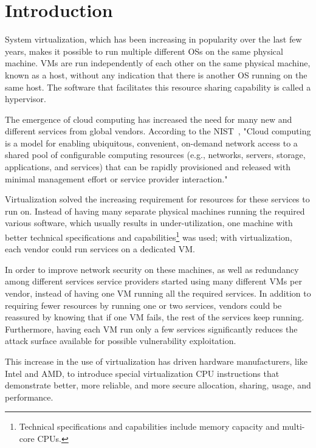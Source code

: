 \chapter{Introduction}\label{ch:intro}

System virtualization, which has been increasing in popularity over the last few years, makes it possible to run multiple different \acp{OS} on the same physical machine. \acp{VM} are run independently of each other on the same physical machine, known as a host, without any indication that there is another \ac{OS} running on the same host. The software that facilitates this resource sharing capability is called a hypervisor.

\par The emergence of cloud computing has increased the need for many new and different services from global vendors. According to the \ac{NIST}~\cite{mell2011nist}, "Cloud computing is a model for enabling ubiquitous, convenient, on-demand network access to a shared pool of configurable computing resources (e.g., networks, servers, storage, applications, and services) that can be rapidly provisioned and released with minimal management effort or service provider interaction."  

\par Virtualization solved the increasing requirement for resources for these services to run on. Instead of having many separate physical machines running the required various software, which usually results in under-utilization, one machine with better technical specifications and capabilities\footnote{Technical specifications and capabilities include memory capacity and multi-core \acp{CPU}.} was used; with virtualization, each vendor could run services on a dedicated \ac{VM}. 

\par In order to improve network security on these machines, as well as redundancy among different services service providers started using many different \acp{VM} per vendor, instead of having one \ac{VM} running all the required services. In addition to requiring fewer resources by running one or two services, vendors could be reassured by knowing that if one VM fails, the rest of the services keep running. Furthermore, having each \ac{VM} run only a few services significantly reduces the attack surface available for possible vulnerability exploitation.

\par This increase in the use of virtualization has driven hardware manufacturers, like Intel and AMD, to introduce special virtualization \ac{CPU} instructions that demonstrate better, more reliable, and more secure allocation, sharing, usage, and performance.

